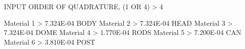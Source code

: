 INPUT ORDER OF QUADRATURE, (1 OR 4) > 4

  Material  1 > 7.324E-04  BODY
  Material  2 > 7.324E-04  HEAD
  Material  3 > 7.324E-04  DOME
  Material  4 > 1.770E-04  RODS
  Material  5 > 7.200E-04  CAN
  Material  6 > 3.810E-04  POST
